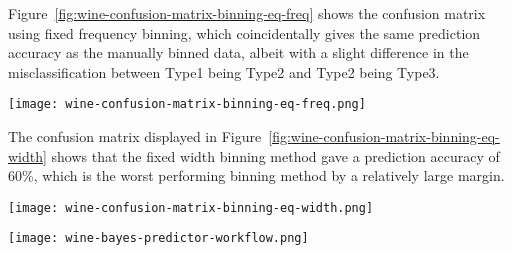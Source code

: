 \documentclass[
  coursecode={CMPE 251},
  assignmentname={Exercise 2},
  studentnumber=20053722,
  name={Bryan Hoang},
]{
  ltxanswer%
}
\begin{document}
\begin{questions}
\begin{solution}
      Figure~\ref{fig:wine-confusion-matrix-binning-eq-freq} shows the confusion matrix using fixed frequency binning, which coincidentally gives the same prediction accuracy as the manually binned data, albeit with a slight difference in the misclassification between Type1 being Type2 and Type2 being Type3.

      \begin{answerfigure}
        \texttt{[image: wine-confusion-matrix-binning-eq-freq.png]}
        \label{fig:wine-confusion-matrix-binning-eq-freq}
      \end{answerfigure}

      The confusion matrix displayed in Figure~\ref{fig:wine-confusion-matrix-binning-eq-width} shows that the fixed width binning method gave a prediction accuracy of \textapprox{}60\%, which is the worst performing binning method by a relatively large margin.

      \newpage

      \begin{answerfigure}
        \texttt{[image: wine-confusion-matrix-binning-eq-width.png]}
        \label{fig:wine-confusion-matrix-binning-eq-width}
      \end{answerfigure}
      \begin{answerfigure}
        \texttt{[image: wine-bayes-predictor-workflow.png]}
        \label{fig:wine-workflow}
      \end{answerfigure}
    \end{solution}
  \end{questions}
\end{document}
